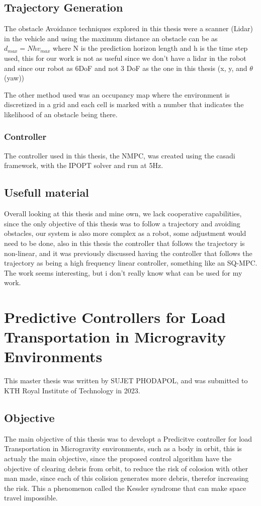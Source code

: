 \documentclass[a4paper,12pt]{article}
\begin{document}
\subsection{Trajectory Generation}
The obstacle Avoidance techniques explored in this thesis were a scanner (Lidar) in the vehicle and using the maximum distance an obstacle can be as $d_{max} =  N h v_{max}$ where N is the prediction horizon length and h is the time step used, this for our work is not as useful since we don't have a lidar in the robot and since our robot as 6DoF and not 3 DoF as the one in this thesis (x, y, and $\theta$ (yaw))

The other method used was an occupancy map where the environment is discretized in a grid and each cell is marked with a number that indicates the likelihood of an obstacle being there.

\subsubsection{Controller}
The controller used in this thesis, the NMPC, was created using the casadi framework, with the IPOPT solver and run at 5Hz.

\subsection{Usefull material}
Overall looking at this thesis and mine own, we lack cooperative capabilities, since the only objective of this thesis was to follow a trajectory and avoiding obstacles, our system is also more complex as a robot, some adjustment would need to be done, also in this thesis the controller that follows the trajectory is non-linear, and it was previously discussed having the controller that follows the trajectory as being a high frequency linear controller, something like an SQ-MPC. The work seems interesting, but i don't really know what can be used for my work.

\section{Predictive Controllers for Load Transportation in Microgravity Environments}
This master thesis\cite{phodapol2023predictive} was written by SUJET PHODAPOL, and was submitted to KTH Royal Institute of Technology in 2023.

\subsection{Objective}
The main objective of this thesis was to developt a Predicitve controller for load Transportation in Microgravity environments, such as a body in orbit, this is actualy the main objective, since the proposed control algorithm have the objective of clearing debris from orbit, to reduce the risk of colosion with other man made, since each of this colision generates more debris, therefor increasing the risk. This a phenomenon called the Kessler syndrome that can make space travel impossible.
\end{document}
